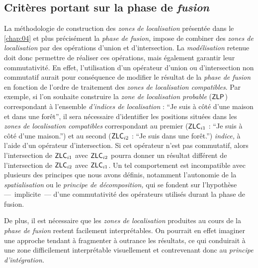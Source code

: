 %   

\subsection{Critères portant sur la phase de \emph{fusion}}

La méthodologie de construction des \emph{zones de localisation}
présentée dans le \autoref{chap:04} et plus précisément la \emph{phase
  de fusion,} impose de combiner des \emph{zones de localisation} par
des opérations d'union et d'intersection. La \emph{modélisation}
retenue doit donc permettre de réaliser ces opérations, mais également
garantir leur commutativité. En effet, l'utilisation d'un opérateur
d'union ou d'intersection non commutatif aurait pour conséquence de
modifier le résultat de la \emph{phase de fusion} en fonction de
l'ordre de traitement des \emph{zones de localisation
  compatibles}. Par exemple, si l'on souhaite construire la \emph{zone
  de localisation probable} ($\text{\textsf{ZLP}}$) correspondant à
l'ensemble \emph{d'indices de localisation} : \enquote{Je suis à côté
  d'une maison et dans une forêt}, il sera nécessaire d'identifier les
positions situées dans les \emph{zones de localisation compatibles}
correspondant au premier ($\text{\textsf{ZLC}}_{i1}$ : \enquote{Je
  suis à côté d'une maison.}) et au second ($\text{\textsf{ZLC}}_{i2}$
: \enquote{Je suis dans une forêt.}) \emph{indice,} à l'aide d'un
opérateur d'intersection. Si cet opérateur n'est pas commutatif, alors
l'intersection de $\text{\textsf{ZLC}}_{i1}$ avec
$\text{\textsf{ZLC}}_{i2}$ pourra donner un résultat différent de
l'intersection de $\text{\textsf{ZLC}}_{i2}$ avec
$\text{\textsf{ZLC}}_{i1}$. Un tel comportement est incompatible avec
plusieurs des principes que nous avons définis, notamment l'autonomie
de la \emph{spatialisation} ou le \emph{principe de décomposition,}
qui se fondent sur l'hypothèse ---~implicite~--- d'une commutativité
des opérateurs utilisés durant la phase de fusion.

De plus, il est nécessaire que les \emph{zones de localisation}
produites au cours de la \emph{phase de fusion} restent facilement
interprétables. On pourrait en effet imaginer une approche tendant à
fragmenter à outrance les résultats, ce qui conduirait à une zone
difficilement interprétable visuellement et contrevenant donc au
\emph{principe d'intégration.}


